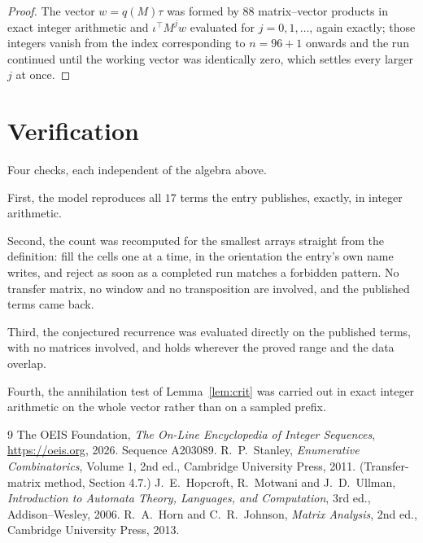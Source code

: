 \documentclass[11pt,a4paper]{article}
\theoremstyle{plain}
\theoremstyle{definition}
\begin{document}
\begin{proof}
The vector $w=q(M)\tau$ was formed by $88$ matrix--vector products in exact integer
arithmetic and $\iota^{\!\top}M^{j}w$ evaluated for $j=0,1,\dots$, again exactly; those
integers vanish from the index corresponding to $n=96+1$ onwards and the run continued
until the working vector was identically zero, which settles every larger $j$ at once.
\end{proof}

\section{Verification}

Four checks, each independent of the algebra above.

First, the model reproduces all $17$ terms the entry publishes, exactly, in integer
arithmetic.

Second, the count was recomputed for the smallest arrays straight from the definition: fill the
cells one at a time, in the orientation the entry's own name writes, and reject as soon as a
completed run matches a forbidden pattern. No transfer matrix, no window and no transposition
are involved, and the published terms came back.

Third, the conjectured recurrence was evaluated directly on the published terms, with no
matrices involved, and holds wherever the proved range and the data overlap.

Fourth, the annihilation test of Lemma~\ref{lem:crit} was carried out in exact integer
arithmetic on the whole vector rather than on a sampled prefix.

\begin{thebibliography}{9}
 The OEIS Foundation, \emph{The On-Line Encyclopedia of Integer
Sequences}, \url{https://oeis.org}, 2026. Sequence A203089.
 R.~P.~Stanley, \emph{Enumerative Combinatorics}, Volume 1, 2nd ed.,
Cambridge University Press, 2011. (Transfer-matrix method, Section 4.7.)
 J.~E.~Hopcroft, R.~Motwani and J.~D.~Ullman, \emph{Introduction to Automata
Theory, Languages, and Computation}, 3rd ed., Addison--Wesley, 2006.
 R.~A.~Horn and C.~R.~Johnson, \emph{Matrix Analysis}, 2nd ed., Cambridge
University Press, 2013.
\end{thebibliography}
\end{document}
